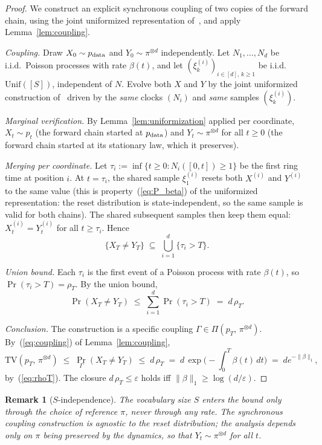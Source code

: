\documentclass{article} %
\newtheorem*{remark*}{Remark}
\def\eqref#1{equation~\ref{#1}}
\newcommand{\TV}{\mathrm{TV}}
\renewcommand{\eqref}[1]{\textup{(\ref{#1})}}
\begin{document}
\begin{proof}
We construct an explicit synchronous coupling of two copies of the
forward chain, using the joint uniformized representation of~, and apply Lemma~\ref{lem:coupling}.

\medskip
\noindent\emph{Coupling.} Draw $X_0 \sim p_{\rm data}$ and
$Y_0 \sim \pi^{\otimes d}$ independently. Let $N_1, \dots, N_d$ be
i.i.d.\ Poisson processes with rate $\beta(t)$, and let
$(\xi^{(i)}_k)_{i \in [d],\, k \ge 1}$ be i.i.d.\ $\mathrm{Unif}([S])$,
independent of $N$. Evolve both $X$ and $Y$ by the joint uniformized
construction of~ driven by the \emph{same} clocks $(N_i)$ and
\emph{same} samples $(\xi^{(i)}_k)$.

\medskip
\noindent\emph{Marginal verification.} By Lemma~\ref{lem:uniformization}
applied per coordinate, $X_t \sim p_t$ (the forward chain started at
$p_{\rm data}$) and $Y_t \sim \pi^{\otimes d}$ for all $t \ge 0$ (the
forward chain started at its stationary law, which it preserves).

\medskip
\noindent\emph{Merging per coordinate.} Let
$\tau_i := \inf\{t \ge 0 : N_i([0,t]) \ge 1\}$ be the first ring time
at position $i$. At $t = \tau_i$, the shared sample $\xi^{(i)}_1$
resets both $X^{(i)}$ and $Y^{(i)}$ to the same value (this is
property~\eqref{eq:P_beta} of the uniformized representation: the
reset distribution is state-independent, so the same sample is valid
for both chains). The shared subsequent samples then keep them equal:
$X^{(i)}_t = Y^{(i)}_t$ for all $t \ge \tau_i$. Hence
\[
  \{X_T \neq Y_T\} \;\subseteq\; \bigcup_{i=1}^d \{\tau_i > T\}.
\]

\medskip
\noindent\emph{Union bound.} Each $\tau_i$ is the first event of a
Poisson process with rate $\beta(t)$, so $\Pr(\tau_i > T) = \rho_T$.
By the union bound,
\[
  \Pr(X_T \neq Y_T) \;\le\; \sum_{i=1}^d \Pr(\tau_i > T) \;=\; d\,\rho_T.
\]

\medskip
\noindent\emph{Conclusion.} The construction is a specific coupling
$\Gamma \in \Pi(p_T,\, \pi^{\otimes d})$. By~\eqref{eq:coupling} of Lemma~\ref{lem:coupling},
\[
  \TV(p_T,\, \pi^{\otimes d})
  \;\le\; \Pr_\Gamma(X_T \neq Y_T)
  \;\le\; d\,\rho_T \;=\; d\,\exp\!\Big(-\!\int_0^T \beta(t)\,dt\Big) \;=\;  d e^{-\| \beta \|_1},
\]
by~\eqref{eq:rhoT}.
The closure $d\,\rho_T \le \varepsilon$ holds iff
$\|\beta\|_1 \ge \log(d/\varepsilon)$. \qedhere
\end{proof}

\begin{remark*}[$S$-independence]
The vocabulary size $S$ enters the bound only through the choice of
reference $\pi$, never through any rate. The synchronous coupling
construction is agnostic to the reset distribution; the analysis
depends only on $\pi$ being preserved by the dynamics, so that
$Y_t \sim \pi^{\otimes d}$ for all $t$.
\end{remark*}
\end{document}

